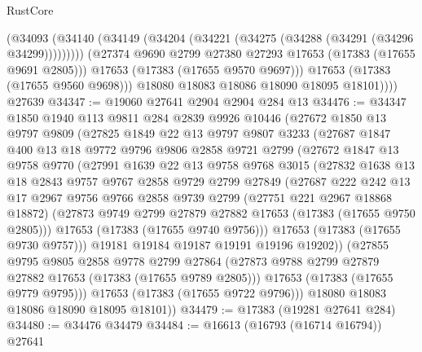 \begin{lexlean}{RustCore}
\begin{coremodule}
                (@34093
                  (@34140 (@34149 (@34204 (@34221 (@34275 (@34288 (@34291 (@34296 @34299)))))))))
                (@27374 @9690 @2799 @27380 @27293 @17653 (@17383 (@17655 @9691 @2805)))
                @17653
                (@17383 (@17655 @9570 @9697)))
              @17653
              (@17383 (@17655 @9560 @9698)))
            @18080
            @18083
            @18086
            @18090
            @18095
            @18101))))
    @27639
@34347 := @19060 @27641 @2904 @2904 @284 @13
@34476 := @34347
    @1850
    @1940
    @113
    @9811
    @284
    @2839
    @9926
    @10446
    (@27672
      @1850
      @13
      @9797
      @9809
      (@27825
        @1849
        @22
        @13
        @9797
        @9807
        @3233
        (@27687
          @1847
          @400
          @13
          @18
          @9772
          @9796
          @9806
          @2858
          @9721
          @2799
          (@27672
            @1847
            @13
            @9758
            @9770
            (@27991
              @1639
              @22
              @13
              @9758
              @9768
              @3015
              (@27832
                @1638
                @13
                @18
                @2843
                @9757
                @9767
                @2858
                @9729
                @2799
                @27849
                (@27687
                  @222
                  @242
                  @13
                  @17
                  @2967
                  @9756
                  @9766
                  @2858
                  @9739
                  @2799
                  (@27751 @221 @2967 @18868 @18872)
                  (@27873 @9749 @2799 @27879 @27882 @17653 (@17383 (@17655 @9750 @2805)))
                  @17653
                  (@17383 (@17655 @9740 @9756)))
                @17653
                (@17383 (@17655 @9730 @9757)))
              @19181
              @19184
              @19187
              @19191
              @19196
              @19202))
          (@27855
            @9795
            @9805
            @2858
            @9778
            @2799
            @27864
            (@27873 @9788 @2799 @27879 @27882 @17653 (@17383 (@17655 @9789 @2805)))
            @17653
            (@17383 (@17655 @9779 @9795)))
          @17653
          (@17383 (@17655 @9722 @9796)))
        @18080
        @18083
        @18086
        @18090
        @18095
        @18101))
@34479 := @17383 (@19281 @27641 @284)
@34480 := @34476 @34479
@34484 := @16613 (@16793 (@16714 @16794)) @27641

\end{coremodule}
\end{lexlean}
